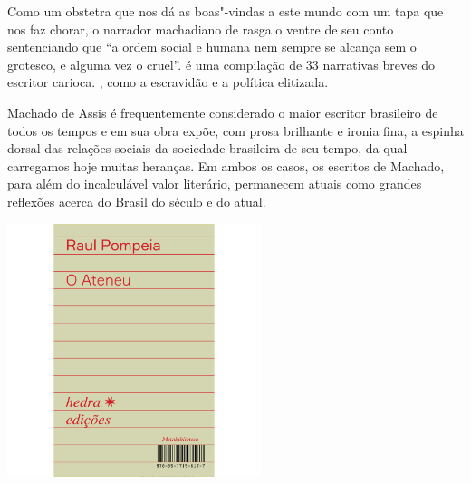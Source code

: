 \hspace*{-7cm}\hrulefill\hspace*{-7cm}

\medskip

\noindent{}Como um obstetra que nos dá as boas"-vindas a este mundo com um tapa que nos faz chorar, o narrador machadiano de {} rasga o ventre de seu conto sentenciando que “a ordem social e humana nem sempre se alcança sem o grotesco, e alguma vez o cruel”. {} é uma compilação de 33 narrativas breves do escritor carioca. , como a escravidão e a política elitizada.

Machado de Assis é frequentemente considerado o maior escritor brasileiro de todos os tempos e em sua obra expõe, com prosa brilhante e ironia fina, a espinha dorsal das relações sociais da sociedade brasileira de seu tempo, da qual carregamos hoje muitas heranças. Em ambos os casos, os escritos de Machado, para além do incalculável valor literário, permanecem atuais como grandes reflexões acerca do Brasil do século  e do atual.


\vfill

\hspace*{-.4cm}\begin{minipage}[c]{.5\linewidth}
\small{
{}}
\end{minipage}

\pagebreak %

\begin{center}
\hspace*{-3.6cm}
\hspace*{3.1cm}\includegraphics[width=74mm]{./grid/ateneu.jpg}
\end{center}

